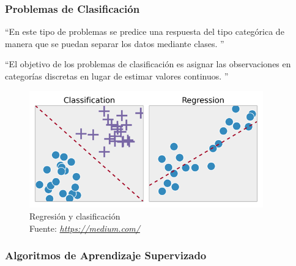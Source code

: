 \subsubsection*{Problemas de Clasificación}
\textquotedblleft En este tipo de problemas se predice una respuesta del tipo categórica de manera que se puedan separar los datos mediante clases. \textquotedblright \cite{WEBSITE:2}

\textquotedblleft El objetivo de los problemas de clasificación es asignar las observaciones en categorías discretas en lugar de estimar valores continuos. \textquotedblright \cite{WEBSITE:1}


\begin{figure}[H]
	\centering
	\includegraphics[width=0.9\textwidth]{Figures/regreclas.png}
	\caption{Regresión y clasificación \\ Fuente:  \href{https://medium.com/deep-math-machine-learning-ai/different-types-of-machine-learning-and-their-types-34760b9128a2}{\textit{https://medium.com/}}}
	\label{Regresion}
\end{figure} 

\subsubsection*{Algoritmos de Aprendizaje Supervizado}
